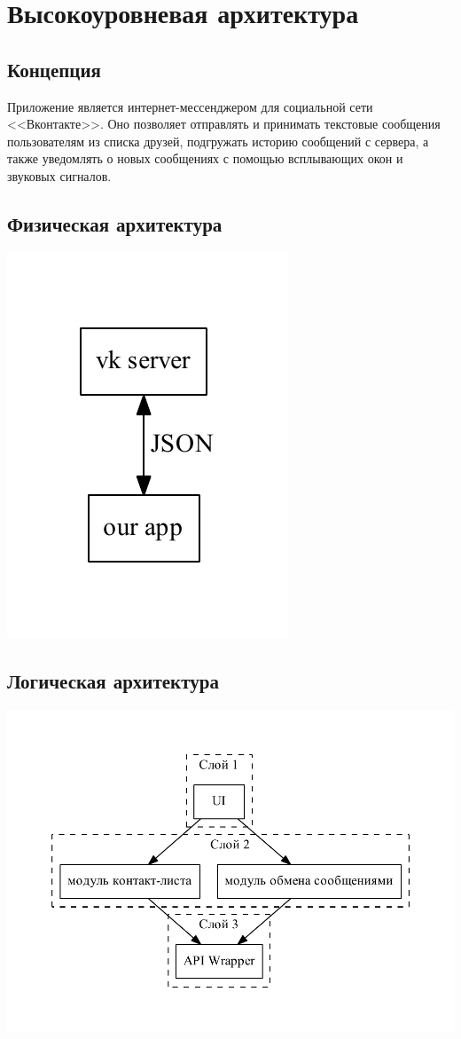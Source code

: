 \documentclass[12pt]{article}
\begin{document}

\tableofcontents{}



\newpage
\section{Высокоуровневая архитектура}
\subsection{Концепция}
Приложение является интернет-мессенджером для социальной сети <<Вконтакте>>. Оно позволяет отправлять и принимать текстовые сообщения пользователям из списка друзей, подгружать историю сообщений с сервера, а также уведомлять о новых сообщениях с помощью всплывающих окон и звуковых сигналов.

\subsection{Физическая архитектура}
\includegraphics{../HLA/diag/phys.pdf}

\subsection{Логическая архитектура}
\includegraphics{../HLA/diag/logic.pdf}
\end{document}
